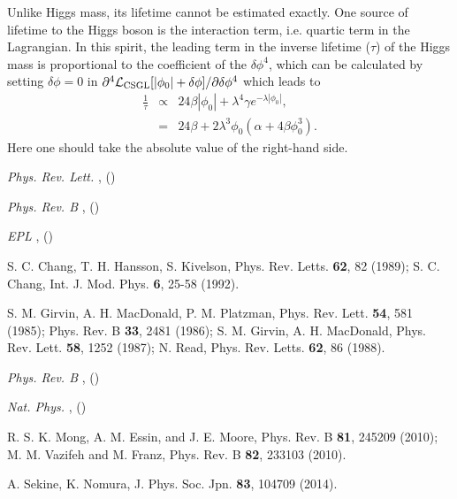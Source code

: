 \documentclass[aps,floatfix,prl]{revtex4}
\begin{document}
Unlike Higgs mass, its lifetime cannot be estimated exactly. One source of lifetime to the Higgs boson is the interaction term, i.e. quartic term in the Lagrangian. In this spirit, the leading term in the inverse lifetime ($\tau$) of the Higgs mass is proportional to the coefficient of the $\delta\phi^4$, which can be calculated by setting $\delta\phi=0$ in $\partial^4 \mathcal{L}_{\rm CSGL}[|\phi_0|+\delta \phi]/\partial \delta \phi^4$ which leads to 
{
\begin{eqnarray}
\frac{1}{\tau}&\propto& 24 \beta|\phi_0|+\lambda^4\gamma e^{-\lambda|\phi_0|},\nonumber\\
&=& 24\beta+2\lambda^3\phi_0\left(\alpha+4\beta\phi_0^3\right).
\end{eqnarray}
}
Here one should take the absolute value of the right-hand side.


\begin{thebibliography}{10}
	\newblock \emph{ {Phys. Rev. Lett.}}
	\textbf{},  ()

	\newblock \emph{ {Phys. Rev. B}}
	\textbf{},  ()

	\newblock \emph{ {EPL}}
	\textbf{},  ()

  S. C. Chang, T. H. Hansson, S. Kivelson, Phys. Rev. Letts. {\bf 62}, 82 (1989); S. C. Chang, Int. J. Mod. Phys. {\bf 6}, 25-58 (1992).

  S. M. Girvin, A. H. MacDonald, P. M. Platzman, Phys. Rev. Lett.  {\bf 54}, 581 (1985);  Phys. Rev. B {\bf 33}, 2481 (1986); S. M. Girvin, A. H. MacDonald, Phys. Rev. Lett. {\bf 58}, 1252 (1987); N. Read, Phys. Rev. Letts. {\bf 62}, 86 (1988).

	\newblock \emph{ {Phys. Rev. B}}
	\textbf{},  ()
	
	\newblock \emph{ {Nat. Phys.}}
	\textbf{},  ()	
	
       R. S. K. Mong, A. M. Essin, and J. E. Moore, Phys. Rev. B {\bf 81}, 245209 (2010); M. M. Vazifeh and M. Franz, Phys. Rev. B {\bf 82}, 233103 (2010).

A. Sekine, K. Nomura, J. Phys. Soc. Jpn. {\bf 83}, 104709 (2014).

\end{thebibliography}
\end{document}
